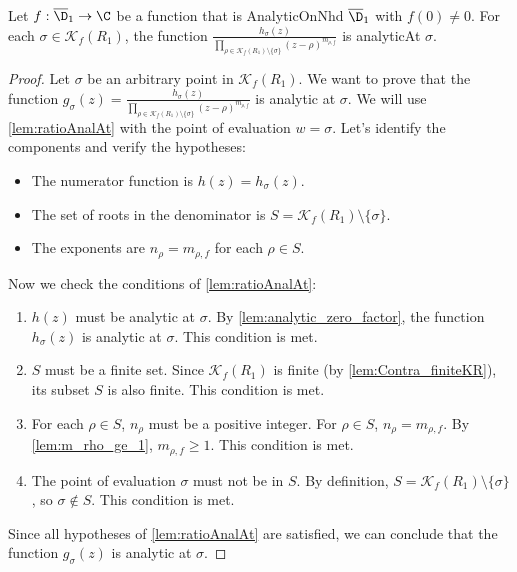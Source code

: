 \begin{lemma}\label{lem:h_ratio_anal} \leanok {}
Let $f:\overline{\D}_1\to\C$ be a function that is AnalyticOnNhd $\overline{\D}_1$ with $f(0)\neq0$. For each $\sigma \in \mathcal{K}_f(R_1)$, the function $\frac{h_\sigma(z)}{\prod_{\rho\in\mathcal{K}_f(R_1) \setminus\{\sigma\}}(z-\rho)^{m_{\rho,f}}}$ is analyticAt $\sigma$.
\end{lemma}
\begin{proof}
\leanok
Let $\sigma$ be an arbitrary point in $\mathcal{K}_f(R_1)$. We want to prove that the function $g_\sigma(z) = \frac{h_\sigma(z)}{\prod_{\rho\in\mathcal{K}_f(R_1) \setminus\{\sigma\}}(z-\rho)^{m_{\rho,f}}}$ is analytic at $\sigma$.
We will use \cref{lem:ratioAnalAt} with the point of evaluation $w=\sigma$. Let's identify the components and verify the hypotheses:
\begin{itemize}
    \item The numerator function is $h(z) = h_\sigma(z)$.
    \item The set of roots in the denominator is $S = \mathcal{K}_f(R_1) \setminus \{\sigma\}$.
    \item The exponents are $n_\rho = m_{\rho,f}$ for each $\rho \in S$.
\end{itemize}
Now we check the conditions of \cref{lem:ratioAnalAt}:
\begin{enumerate}
    \item $h(z)$ must be analytic at $\sigma$. By \cref{lem:analytic_zero_factor}, the function $h_\sigma(z)$ is analytic at $\sigma$. This condition is met.
    \item $S$ must be a finite set. Since $\mathcal{K}_f(R_1)$ is finite (by \cref{lem:Contra_finiteKR}), its subset $S$ is also finite. This condition is met.
    \item For each $\rho \in S$, $n_\rho$ must be a positive integer. For $\rho \in S$, $n_\rho = m_{\rho,f}$. By \cref{lem:m_rho_ge_1}, $m_{\rho,f} \ge 1$. This condition is met.
    \item The point of evaluation $\sigma$ must not be in $S$. By definition, $S = \mathcal{K}_f(R_1) \setminus \{\sigma\}$, so $\sigma \notin S$. This condition is met.
\end{enumerate}
Since all hypotheses of \cref{lem:ratioAnalAt} are satisfied, we can conclude that the function $g_\sigma(z)$ is analytic at $\sigma$.
\end{proof}

